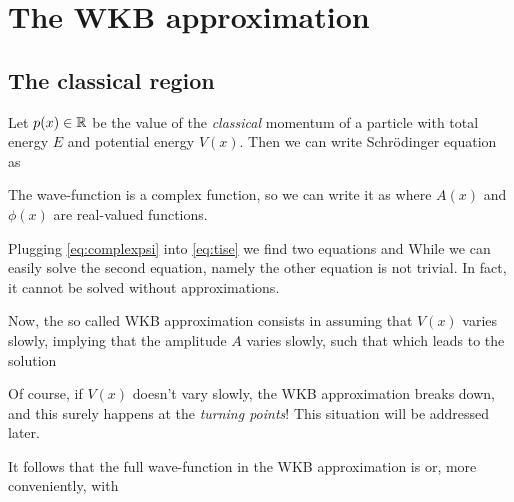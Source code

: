 \documentclass[oneside, 12pt, notitlepage]{book}
\begin{document}
\pagestyle{mynotespage}

\chapter{The WKB approximation}

\section{The classical region}

Let \(p(x)\in \mathbb{R}\)
be the value of the \emph{classical} momentum of a particle with total energy \(E\) and potential energy \(V(x)\). Then we can write Schrödinger equation as
\par

The wave-function is a complex function, so we can write it as
where \(A(x)\) and \(\phi(x)\) are real-valued functions.\par

Plugging \eqref{eq:complexpsi} into \eqref{eq:tise} we find two equations
and
While we can easily solve the second equation, namely
the other equation is not trivial. In fact, it cannot be solved without approximations.\par

Now, the so called WKB approximation consists in assuming that \(V(x)\) varies slowly, implying that the amplitude \(A\) varies slowly, such that
which leads to the solution
\par

Of course, if \(V(x)\) doesn't vary slowly, the WKB approximation breaks down, and this surely happens at the \emph{turning points}! This situation will be addressed later.\par

It follows that the full wave-function in the WKB approximation is
or, more conveniently,
with
\par
\end{document}
